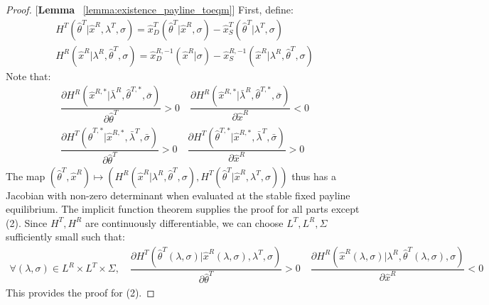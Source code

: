 \begin{proof}{[\textbf{Lemma} ~\ref{lemma:existence_payline_toeqm}]} First, define:
\begin{gather*}
  H^T(\hat{\theta}^T|\hat{x}^R,\lambda^T,\sigma) = \hat{x}^T_D(\hat{\theta}^T|\hat{x}^R,\sigma) - \hat{x}^T_S(\hat{\theta}^T|\lambda^T,\sigma) \\
  H^R(\hat{x}^R|\lambda^R,\hat{\theta}^T,\sigma) = \hat{x}^{R,-1}_D(\hat{x}^R|\sigma) - \hat{x}^{R,-1}_S(\hat{x}^R|\lambda^R,\hat{\theta}^T,\sigma)
\end{gather*}
Note that:
\begin{gather*}
   \dfrac{\partial H^R(\hat{x}^{R,*}|\bar{\lambda}^R,\hat{\theta}^{T,*},\bar{\sigma}) }{\partial \hat{\theta}^T} > 0 \quad \dfrac{\partial H^R(\hat{x}^{R,*}|\bar{\lambda}^R,\hat{\theta}^{T,*},\bar{\sigma}) }{\partial \hat{x}^R} < 0 \\  \dfrac{\partial H^T(\hat{\theta}^{T,*}|\hat{x}^{R,*},\bar{\lambda}^T, \bar{\sigma})}{\partial \hat{\theta}^T} > 0 \quad \dfrac{\partial H^T(\hat{\theta}^{T,*}|\hat{x}^{R,*},\bar{\lambda}^T, \bar{\sigma})}{\partial \hat{x}^R} > 0 
\end{gather*}
The map $(\hat{\theta}^T,\hat{x}^R)\mapsto (H^R(\hat{x}^R|\lambda^R,\hat{\theta}^T,\sigma),H^T(\hat{\theta}^T|\hat{x}^R,\lambda^T,\sigma))$ thus has a Jacobian with non-zero determinant when evaluated at the stable fixed payline equilibrium. The implicit function theorem supplies the proof for all parts except (2). Since $H^T,H^R$ are continuously differentiable, we can choose $L^T,L^R,\Sigma$ sufficiently small such that:
\begin{align*}
  \forall (\lambda,\sigma)\in L^R\times L^T\times \Sigma,\quad \dfrac{\partial H^T(\hat{\theta}^{T}(\lambda,\sigma)|\hat{x}^{R}(\lambda,\sigma),\lambda^T,\sigma)}{\partial \hat{\theta}^T} > 0 \quad \dfrac{\partial H^R(\hat{x}^{R}(\lambda,\sigma)|\lambda^R,\hat{\theta}^{T}(\lambda,\sigma),\sigma) }{\partial \hat{x}^R} < 0
\end{align*}
This provides the proof for (2). 
\end{proof}

